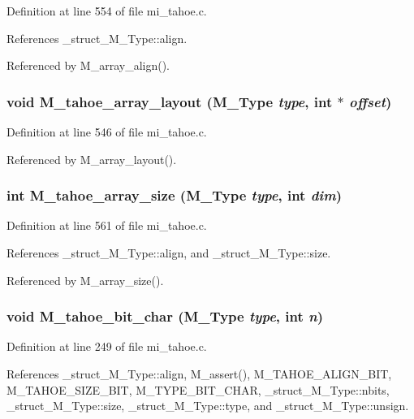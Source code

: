 Definition at line 554 of file mi\_\-tahoe.c.

References \_\-struct\_\-M\_\-Type::align.

Referenced by M\_\-array\_\-align().
\subsubsection{\setlength{\rightskip}{0pt plus 5cm}void M\_\-tahoe\_\-array\_\-layout (\bf{M\_\-Type} {\em type}, int $\ast$ {\em offset})}\label{mi__tahoe_8c_3d76a0fdf56be863526be8b3a8fe5967}




Definition at line 546 of file mi\_\-tahoe.c.

Referenced by M\_\-array\_\-layout().
\subsubsection{\setlength{\rightskip}{0pt plus 5cm}int M\_\-tahoe\_\-array\_\-size (\bf{M\_\-Type} {\em type}, int {\em dim})}\label{mi__tahoe_8c_3eee62ce39ed239f6ece3b07c8ffcf34}




Definition at line 561 of file mi\_\-tahoe.c.

References \_\-struct\_\-M\_\-Type::align, and \_\-struct\_\-M\_\-Type::size.

Referenced by M\_\-array\_\-size().
\subsubsection{\setlength{\rightskip}{0pt plus 5cm}void M\_\-tahoe\_\-bit\_\-char (\bf{M\_\-Type} {\em type}, int {\em n})}\label{mi__tahoe_8c_2933c805e70790bd174a1d77ecda16b2}




Definition at line 249 of file mi\_\-tahoe.c.

References \_\-struct\_\-M\_\-Type::align, M\_\-assert(), M\_\-TAHOE\_\-ALIGN\_\-BIT, M\_\-TAHOE\_\-SIZE\_\-BIT, M\_\-TYPE\_\-BIT\_\-CHAR, \_\-struct\_\-M\_\-Type::nbits, \_\-struct\_\-M\_\-Type::size, \_\-struct\_\-M\_\-Type::type, and \_\-struct\_\-M\_\-Type::unsign.

